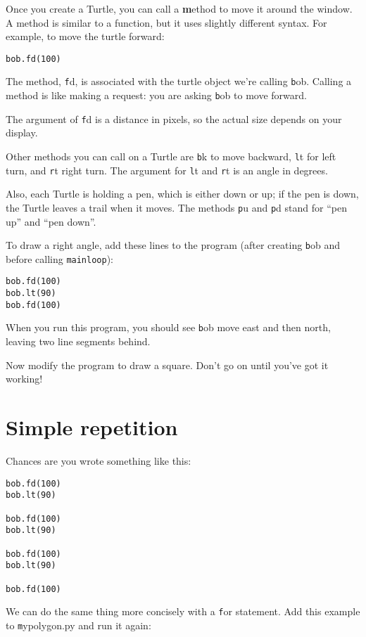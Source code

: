 \documentclass[
DIV=11,
fontsize=13,
twoside,
headinclude=false,
titlepage=firstiscover,
abstract=true,
headsepline=true,
footsepline=true,
chapterprefix=true, %
headings=big,
bibliography=totoc,%
captions=tableheading
]{scrbook}
\theoremstyle{definition}
\begin{document}
Once you create a Turtle, you can call a {\textbf method} to move it
around the window.  A method is similar to a function, but it
uses slightly different syntax.  For example, to move the turtle
forward:

\begin{lstlisting}
bob.fd(100)
\end{lstlisting}
%
The method, {\texttt fd}, is associated with the turtle
object we're calling {\texttt bob}.  
Calling a method is like making a request: you are asking {\texttt bob}
to move forward.

The argument of {\texttt fd} is a distance in pixels, so the actual
size depends on your display.

Other methods you can call on a Turtle are {\texttt bk} to move
backward, {\texttt lt} for left turn, and {\texttt rt} right turn.  The
argument for {\texttt lt} and {\texttt rt} is an angle in degrees.

Also, each Turtle is holding a pen, which is
either down or up; if the pen is down, the Turtle leaves
a trail when it moves.  The methods {\texttt pu} and {\texttt pd}
stand for ``pen up'' and ``pen down''.

To draw a right angle, add these lines to the program
(after creating {\texttt bob} and before calling \verb"mainloop"):

\begin{lstlisting}
bob.fd(100)
bob.lt(90)
bob.fd(100)
\end{lstlisting}
%
When you run this program, you should see {\texttt bob} move east and then
north, leaving two line segments behind.

Now modify the program to draw a square.  Don't go on until
you've got it working!


\section{Simple repetition}
\label{repetition}

Chances are you wrote something like this:

\begin{lstlisting}
bob.fd(100)
bob.lt(90)

bob.fd(100)
bob.lt(90)

bob.fd(100)
bob.lt(90)

bob.fd(100)
\end{lstlisting}
%
We can do the same thing more concisely with a {\texttt for} statement.
Add this example to {\texttt mypolygon.py} and run it again:
\end{document}
